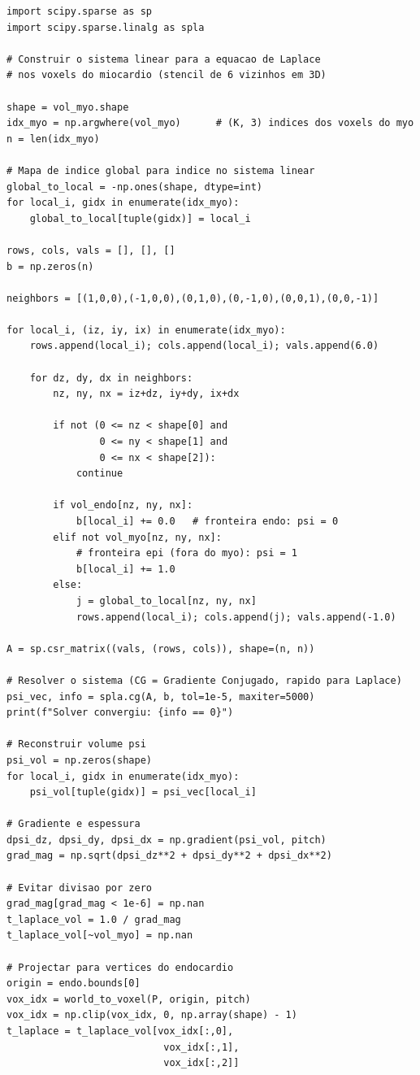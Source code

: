 \begin{lstlisting}
import scipy.sparse as sp
import scipy.sparse.linalg as spla

# Construir o sistema linear para a equacao de Laplace
# nos voxels do miocardio (stencil de 6 vizinhos em 3D)

shape = vol_myo.shape
idx_myo = np.argwhere(vol_myo)      # (K, 3) indices dos voxels do myo
n = len(idx_myo)

# Mapa de indice global para indice no sistema linear
global_to_local = -np.ones(shape, dtype=int)
for local_i, gidx in enumerate(idx_myo):
    global_to_local[tuple(gidx)] = local_i

rows, cols, vals = [], [], []
b = np.zeros(n)

neighbors = [(1,0,0),(-1,0,0),(0,1,0),(0,-1,0),(0,0,1),(0,0,-1)]

for local_i, (iz, iy, ix) in enumerate(idx_myo):
    rows.append(local_i); cols.append(local_i); vals.append(6.0)

    for dz, dy, dx in neighbors:
        nz, ny, nx = iz+dz, iy+dy, ix+dx

        if not (0 <= nz < shape[0] and
                0 <= ny < shape[1] and
                0 <= nx < shape[2]):
            continue

        if vol_endo[nz, ny, nx]:
            b[local_i] += 0.0   # fronteira endo: psi = 0
        elif not vol_myo[nz, ny, nx]:
            # fronteira epi (fora do myo): psi = 1
            b[local_i] += 1.0
        else:
            j = global_to_local[nz, ny, nx]
            rows.append(local_i); cols.append(j); vals.append(-1.0)

A = sp.csr_matrix((vals, (rows, cols)), shape=(n, n))

# Resolver o sistema (CG = Gradiente Conjugado, rapido para Laplace)
psi_vec, info = spla.cg(A, b, tol=1e-5, maxiter=5000)
print(f"Solver convergiu: {info == 0}")

# Reconstruir volume psi
psi_vol = np.zeros(shape)
for local_i, gidx in enumerate(idx_myo):
    psi_vol[tuple(gidx)] = psi_vec[local_i]

# Gradiente e espessura
dpsi_dz, dpsi_dy, dpsi_dx = np.gradient(psi_vol, pitch)
grad_mag = np.sqrt(dpsi_dz**2 + dpsi_dy**2 + dpsi_dx**2)

# Evitar divisao por zero
grad_mag[grad_mag < 1e-6] = np.nan
t_laplace_vol = 1.0 / grad_mag
t_laplace_vol[~vol_myo] = np.nan

# Projectar para vertices do endocardio
origin = endo.bounds[0]
vox_idx = world_to_voxel(P, origin, pitch)
vox_idx = np.clip(vox_idx, 0, np.array(shape) - 1)
t_laplace = t_laplace_vol[vox_idx[:,0],
                           vox_idx[:,1],
                           vox_idx[:,2]]
\end{lstlisting}

